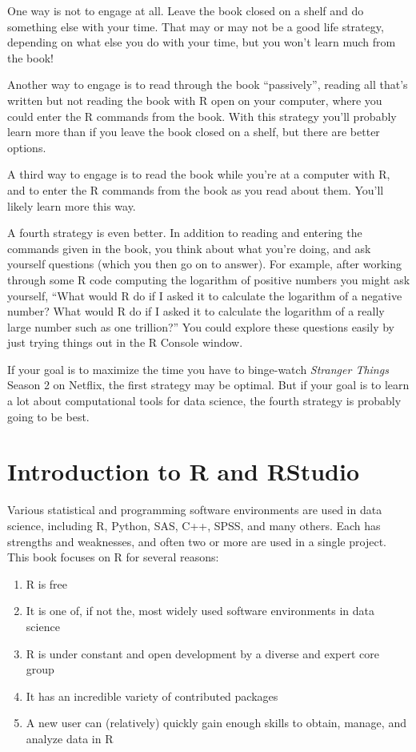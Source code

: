 \documentclass[]{krantz}
\providecommand{\tightlist}{%
  \setlength{\itemsep}{0pt}\setlength{\parskip}{0pt}}
\theoremstyle{definition}
\theoremstyle{definition}
\theoremstyle{definition}
\theoremstyle{remark}
\begin{document}
One way is not to engage at all. Leave the book closed on a shelf and do
something else with your time. That may or may not be a good life
strategy, depending on what else you do with your time, but you won't
learn much from the book!

Another way to engage is to read through the book ``passively'', reading
all that's written but not reading the book with R open on your
computer, where you could enter the R commands from the book. With this
strategy you'll probably learn more than if you leave the book closed on
a shelf, but there are better options.

A third way to engage is to read the book while you're at a computer
with R, and to enter the R commands from the book as you read about
them. You'll likely learn more this way.

A fourth strategy is even better. In addition to reading and entering
the commands given in the book, you think about what you're doing, and
ask yourself questions (which you then go on to answer). For example,
after working through some R code computing the logarithm of positive
numbers you might ask yourself, ``What would R do if I asked it to
calculate the logarithm of a negative number? What would R do if I asked
it to calculate the logarithm of a really large number such as one
trillion?'' You could explore these questions easily by just trying
things out in the R Console window.

If your goal is to maximize the time you have to binge-watch
\emph{Stranger Things} Season 2 on Netflix, the first strategy may be
optimal. But if your goal is to learn a lot about computational tools
for data science, the fourth strategy is probably going to be best.

\chapter{Introduction to R and
RStudio}\label{introduction-to-r-and-rstudio}

Various statistical and programming software environments are used in
data science, including R, Python, SAS, C++, SPSS, and many others. Each
has strengths and weaknesses, and often two or more are used in a single
project. This book focuses on R for several reasons:

\begin{enumerate}
\def\labelenumi{\arabic{enumi}.}
\tightlist
\item
  R is free
\item
  It is one of, if not the, most widely used software environments in
  data science
\item
  R is under constant and open development by a diverse and expert core
  group
\item
  It has an incredible variety of contributed packages
\item
  A new user can (relatively) quickly gain enough skills to obtain,
  manage, and analyze data in R
\end{enumerate}
\end{document}
